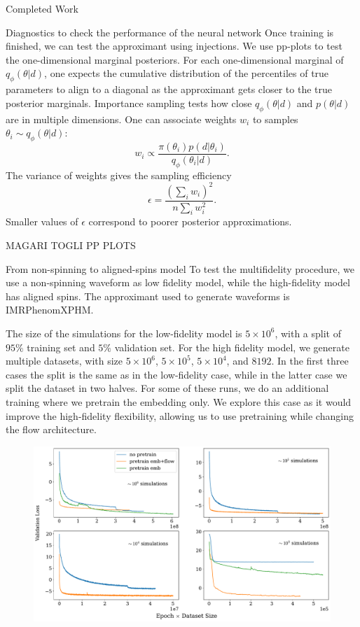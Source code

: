 \documentclass[a4paper, 12pt, twoside, openright, titlepage]{book}
\begin{document}
\begin{chapter}{Completed Work}
\begin{section}{Diagnostics to check the performance of the neural network}
Once training is finished, we can test the approximant using injections.
We use pp-plots to test the one-dimensional marginal posteriors.
For each one-dimensional marginal of $q_{\phi}(\theta|d)$, one expects the cumulative distribution of the percentiles of true parameters to align to a diagonal as the approximant gets closer to the true posterior marginals.
Importance sampling tests how close $q_{\phi}(\theta|d)$ and $p(\theta|d)$ are in multiple dimensions.
One can associate weights $w_{i}$ to samples $\theta_{i}\sim q_{\phi}(\theta|d)$:
\begin{equation}
w_{i} \propto \frac{\pi(\theta_{i})p(d|\theta_{i})}{q_{\phi}(\theta_{i}|d)}.
\end{equation}
The variance of weights gives the sampling efficiency
\begin{equation}
\epsilon = \frac{\left(\sum_{i}w_{i}\right)^{2}}{n\sum_{i}w_{i}^{2}}.
\end{equation}
Smaller values of $\epsilon$ correspond to poorer posterior approximations.


MAGARI TOGLI PP PLOTS
\end{section}


\begin{section}{From non-spinning to aligned-spins model}
To test the multifidelity procedure, we use a non-spinning waveform as low fidelity model, while the high-fidelity model has aligned spins.
The approximant used to generate waveforms is IMRPhenomXPHM.

The size of the simulations for the low-fidelity model is $5\times10^6$, with a split of $95\%$ training set and $5\%$ validation set. For the high fidelity model, we generate multiple datasets, with size $5\times10^6$, $5\times10^5$, $5\times10^4$, and $8192$. In the first three cases the split is the same as in the low-fidelity case, while in the latter case we split the dataset in two halves.
For some of these runs, we do an additional training where we pretrain the embedding only.
We explore this case as it would improve the high-fidelity flexibility, allowing us to use pretraining while changing the flow architecture.

\begin{figure}
\includegraphics[width=0.97\columnwidth]{figures/val_loss.pdf}
\caption{}
\label{loss}
\end{figure}



\end{section}
\end{chapter}
\end{document}
